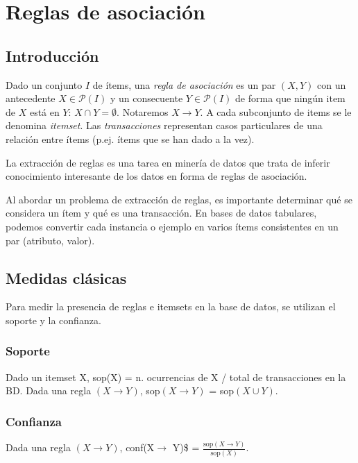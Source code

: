 \documentclass[a4paper,11pt,spanish]{report}
\let\stdchapter\chapter
\let\stdsection\section
\let\stdsub\subsection
\let\stdsubsub\subsubsection
\renewcommand{\part}{\stdchapter}
\renewcommand{\chapter}{\stdsection}
\renewcommand{\section}{\stdsub}
\renewcommand{\subsection}{\stdsubsub}
\begin{document}
\part{Reglas de asociación}
\label{sec-3}

\chapter{Introducción}
\label{sec-3-1}

Dado un conjunto $I$ de ítems, una \emph{regla de asociación} es un par $(X, Y)$ con un antecedente $X\in\mathcal P(I)$ y un consecuente $Y\in\mathcal P(I)$ de forma que ningún item de $X$ está en $Y$: $X\cap Y = \emptyset$.  Notaremos $X\rightarrow Y$. A cada subconjunto de items se le denomina \emph{itemset}. Las \emph{transacciones} representan casos particulares de una relación entre ítems (p.ej. ítems que se han dado a la vez). 

La extracción de reglas es una tarea en minería de datos que trata de inferir conocimiento interesante de los datos en forma de reglas de asociación.

Al abordar un problema de extracción de reglas, es importante determinar qué se considera un ítem y qué es una transacción. En bases de datos tabulares, podemos convertir cada instancia o ejemplo en varios ítems consistentes en un par (atributo, valor).

\chapter{Medidas clásicas}
\label{sec-3-2}

Para medir la presencia de reglas e itemsets en la base de datos, se utilizan el soporte y la confianza.

\section{Soporte}
\label{sec-3-2-1}

Dado un itemset X, sop(X) = n. ocurrencias de X / total de transacciones en la BD. Dada una regla $(X\rightarrow Y)$, sop$(X\rightarrow Y)$ = sop$(X\cup Y)$. 

\section{Confianza}
\label{sec-3-2-2}

Dada una regla $(X\rightarrow Y)$, conf(X$\rightarrow$ Y)\$ = $\frac{\mathrm{sop}(X\rightarrow Y)}{\mathrm{sop}(X)}$.
\end{document}
